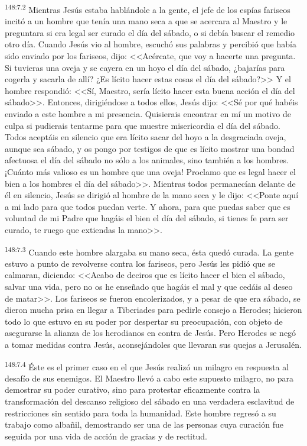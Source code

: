 \par 
\textsuperscript{148:7.2} Mientras Jesús estaba hablándole a la gente, el jefe de los espías fariseos incitó a un hombre que tenía una mano seca a que se acercara al Maestro y le preguntara si era legal ser curado el día del sábado, o si debía buscar el remedio otro día. Cuando Jesús vio al hombre, escuchó sus palabras y percibió que había sido enviado por los fariseos, dijo: <<Acércate, que voy a hacerte una pregunta. Si tuvieras una oveja y se cayera en un hoyo el día del sábado, ¿bajarías para cogerla y sacarla de allí? ¿Es lícito hacer estas cosas el día del sábado?>> Y el hombre respondió: <<Sí, Maestro, sería lícito hacer esta buena acción el día del sábado>>. Entonces, dirigiéndose a todos ellos, Jesús dijo: <<Sé por qué habéis enviado a este hombre a mi presencia. Quisierais encontrar en mí un motivo de culpa si pudierais tentarme para que muestre misericordia el día del sábado. Todos aceptáis en silencio que era lícito sacar del hoyo a la desgraciada oveja, aunque sea sábado, y os pongo por testigos de que es lícito mostrar una bondad afectuosa el día del sábado no sólo a los animales, sino también a los hombres. ¡Cuánto más valioso es un hombre que una oveja! Proclamo que es legal hacer el bien a los hombres el día del sábado>>. Mientras todos permanecían delante de él en silencio, Jesús se dirigió al hombre de la mano seca y le dijo: <<Ponte aquí a mi lado para que todos puedan verte. Y ahora, para que puedas saber que es voluntad de mi Padre que hagáis el bien el día del sábado, si tienes fe para ser curado, te ruego que extiendas la mano>>.

\par 
\textsuperscript{148:7.3} Cuando este hombre alargaba su mano seca, ésta quedó curada. La gente estuvo a punto de revolverse contra los fariseos, pero Jesús les pidió que se calmaran, diciendo: <<Acabo de deciros que es lícito hacer el bien el sábado, salvar una vida, pero no os he enseñado que hagáis el mal y que cedáis al deseo de matar>>. Los fariseos se fueron encolerizados, y a pesar de que era sábado, se dieron mucha prisa en llegar a Tiberiades para pedirle consejo a Herodes; hicieron todo lo que estuvo en su poder por despertar su preocupación, con objeto de asegurarse la alianza de los herodianos en contra de Jesús. Pero Herodes se negó a tomar medidas contra Jesús, aconsejándoles que llevaran sus quejas a Jerusalén.

\par 
\textsuperscript{148:7.4} Éste es el primer caso en el que Jesús realizó un milagro en respuesta al desafío de sus enemigos. El Maestro llevó a cabo este supuesto milagro, no para demostrar su poder curativo, sino para protestar eficazmente contra la transformación del descanso religioso del sábado en una verdadera esclavitud de restricciones sin sentido para toda la humanidad. Este hombre regresó a su trabajo como albañil, demostrando ser una de las personas cuya curación fue seguida por una vida de acción de gracias y de rectitud.

